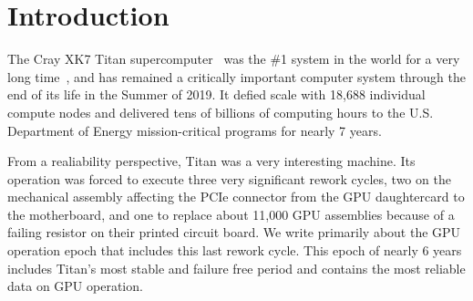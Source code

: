 \section{Introduction}
\label{section:introduction}
The Cray XK7 Titan supercomputer~\cite{olcf:titan} was the \#1 system
in the world for a very long time~\cite{top500list}, and has remained
a critically important computer system through the end of its life in
the Summer of 2019. It defied scale with 18,688 individual compute
nodes and delivered tens of billions of computing hours to the
U.S. Department of Energy mission-critical programs for nearly 7
years.
 
From a realiability perspective, Titan was a very interesting
machine. Its operation was forced to execute three very significant
rework cycles, two on the mechanical assembly affecting the PCIe
connector from the GPU daughtercard to the motherboard, and one to
replace about 11,000 GPU assemblies because of a failing resistor on
their printed circuit board. We write primarily about the GPU
operation epoch that includes this last rework cycle. This epoch of
nearly 6 years includes Titan's most stable and failure free period
and contains the most reliable data on GPU operation.

